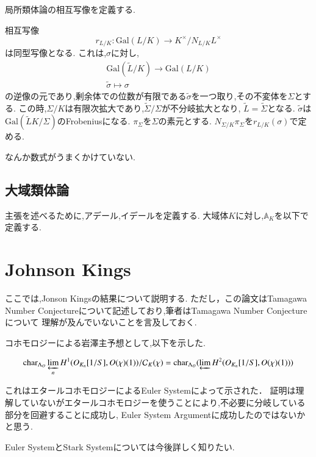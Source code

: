 \documentclass{ujarticle}
\begin{document}
局所類体論の相互写像を定義する.
\begin{thm}
  相互写像
\begin{equation*}
  r_{L/K}: \mathrm{Gal}(L/K) \to K^{\times}/N_{L/K}L^{\times}
\end{equation*}
は同型写像となる.
これは,$\sigma$に対し,
\begin{align}
  \mathrm{Gal}(\tilde{L}/K) \to \mathrm{Gal}(L/K) \\
    \tilde{\sigma} \mapsto \sigma
\end{align}
の逆像の元であり,剰余体での位数が有限である$\tilde{\sigma}$を一つ取り,その不変体を$\Sigma$とする.
この時,$\Sigma/K$は有限次拡大であり,$\tilde{\Sigma}/\Sigma$が不分岐拡大となり,
$\tilde{L}=\tilde{\Sigma}$となる.
$\tilde{\sigma}$は$\mathrm{Gal}(\tilde{L}K/\Sigma)$のFrobeniusになる.
$\pi_{\Sigma}$を$\Sigma$の素元とする.
$N_{\Sigma/K}\pi_{\Sigma}$を$r_{L/K}(\sigma)$で定める.
\end{thm}
\begin{rem}
 なんか数式がうまくかけていない.
\end{rem}

\subsection{大域類体論}
\label{sub:大域類体論}
主張を述べるために,アデール,イデールを定義する.
大域体$K$に対し,$\mathbb{A}_K$を以下で定義する.


\section{Johnson Kings}
\label{sec:Johnson Kings}

ここでは,Jonson Kingsの結果について説明する.
ただし，この論文はTamagawa Number Conjectureについて記述しており,筆者はTamagawa Number Conjectureについて
理解が及んでいないことを言及しておく.

コホモロジーによる岩澤主予想として,以下を示した.
\begin{thm} 
\begin{equation*}
\mathrm{char}_{\Lambda_O}\varprojlim\limits_n H^1(O_{K_n}[1/S], O(\chi)(1)) /\mathcal{C}_K(\chi) = \mathrm{char}_{\Lambda_O}(\varprojlim H^2(O_{K_n}[1/S], O(\chi)(1)))
\end{equation*}
\end{thm}

これはエタールコホモロジーによるEuler Systemによって示された．
証明は理解していないがエタールコホモロジーを使うことにより,不必要に分岐している部分を回避することに成功し,
Euler System Argumentに成功したのではないかと思う.
\begin{rem}
  Euler SystemとStark Systemについては今後詳しく知りたい.
\end{rem}
\end{document}
